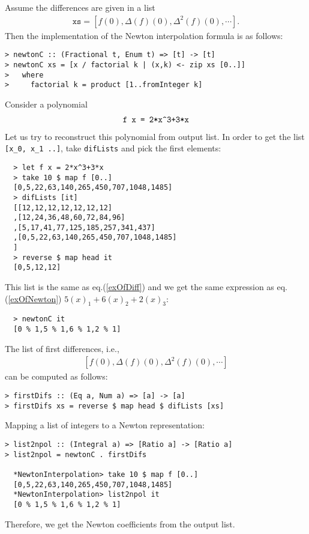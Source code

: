 \documentclass[11pt]{book}
\begin{document}
Assume the differences are given in a list
\begin{eqnarray}
\texttt{xs} = \left[f(0), \Delta(f)(0), \Delta^2(f)(0), \cdots \right].
\end{eqnarray}
Then the implementation of the Newton interpolation formula is as follows:
\begin{verbatim}
> newtonC :: (Fractional t, Enum t) => [t] -> [t]
> newtonC xs = [x / factorial k | (x,k) <- zip xs [0..]]
>   where
>     factorial k = product [1..fromInteger k]
\end{verbatim}
Consider a polynomial
\begin{eqnarray}
\verb|f x = 2*x^3+3*x|
\end{eqnarray}
Let us try to reconstruct this polynomial from output list.
In order to get the list \verb+[x_0, x_1 ..]+, take \texttt{difLists} and pick the first elements:
\begin{verbatim}
  > let f x = 2*x^3+3*x
  > take 10 $ map f [0..]
  [0,5,22,63,140,265,450,707,1048,1485]
  > difLists [it]
  [[12,12,12,12,12,12,12]
  ,[12,24,36,48,60,72,84,96]
  ,[5,17,41,77,125,185,257,341,437]
  ,[0,5,22,63,140,265,450,707,1048,1485]
  ]
  > reverse $ map head it
  [0,5,12,12]
\end{verbatim}
This list is the same as eq.(\ref{exOfDiff}) and we get the same expression as eq.(\ref{exOfNewton}) $5(x)_1 + 6(x)_2 + 2(x)_3$:
\begin{verbatim}  
  > newtonC it
  [0 % 1,5 % 1,6 % 1,2 % 1]
\end{verbatim}

The list of first differences, i.e.,
\begin{eqnarray}
\left[ f(0), \Delta(f)(0), \Delta^2(f)(0), \cdots \right]
\end{eqnarray}
can be computed as follows:
\begin{verbatim}
> firstDifs :: (Eq a, Num a) => [a] -> [a]
> firstDifs xs = reverse $ map head $ difLists [xs]
\end{verbatim}
Mapping a list of integers to a Newton representation:
\begin{verbatim}
> list2npol :: (Integral a) => [Ratio a] -> [Ratio a]
> list2npol = newtonC . firstDifs

  *NewtonInterpolation> take 10 $ map f [0..]
  [0,5,22,63,140,265,450,707,1048,1485]
  *NewtonInterpolation> list2npol it
  [0 % 1,5 % 1,6 % 1,2 % 1]
\end{verbatim}
Therefore, we get the Newton coefficients from the output list.
\end{document}
